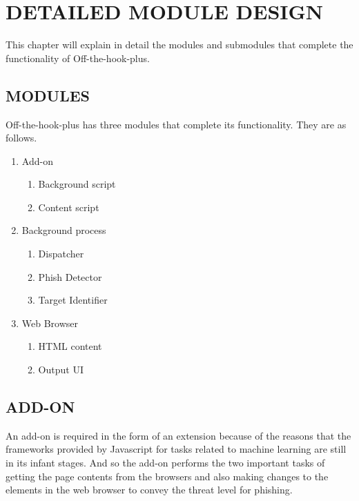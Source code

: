
\chapter{DETAILED MODULE DESIGN} %
This chapter will explain in detail the modules and submodules that complete the functionality of Off-the-hook-plus.


\section{MODULES}
Off-the-hook-plus has three modules that complete its functionality. They are as follows.

\begin{enumerate}
  \item Add-on
  \begin{enumerate}
    \item Background script
    \item Content script
  \end{enumerate}
  \item Background process
  \begin{enumerate}
    \item Dispatcher
    \item Phish Detector
    \item Target Identifier
  \end{enumerate}
  \item Web Browser
  \begin{enumerate}
    \item HTML content
    \item Output UI
  \end{enumerate}
\end{enumerate}

\section{ADD-ON}
An add-on is required in the form of an extension because of the reasons that the frameworks provided by Javascript for tasks related to machine learning are still in its infant stages\cite{tfjs}. And so the add-on performs the two important tasks of getting the page contents from the browsers and also making changes to the elements in the web browser to convey the threat level for phishing.

